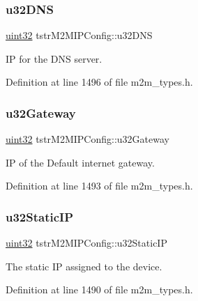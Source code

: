 \subsubsection{\texorpdfstring{u32\+D\+NS}{u32DNS}}
{\footnotesize\ttfamily \hyperlink{group__DataT_ga100e7c691a47d6978527c479a0158245}{uint32} tstr\+M2\+M\+I\+P\+Config\+::u32\+D\+NS}

IP for the D\+NS server. 

Definition at line 1496 of file m2m\+\_\+types.\+h.

\mbox{\label{structtstrM2MIPConfig_ad42bb813617dd8883f434f242ccebf8a}} 
\subsubsection{\texorpdfstring{u32\+Gateway}{u32Gateway}}
{\footnotesize\ttfamily \hyperlink{group__DataT_ga100e7c691a47d6978527c479a0158245}{uint32} tstr\+M2\+M\+I\+P\+Config\+::u32\+Gateway}

IP of the Default internet gateway. 

Definition at line 1493 of file m2m\+\_\+types.\+h.

\mbox{\label{structtstrM2MIPConfig_ad98262f0684c0e7a2ab01e8f3e2cce05}} 
\subsubsection{\texorpdfstring{u32\+Static\+IP}{u32StaticIP}}
{\footnotesize\ttfamily \hyperlink{group__DataT_ga100e7c691a47d6978527c479a0158245}{uint32} tstr\+M2\+M\+I\+P\+Config\+::u32\+Static\+IP}

The static IP assigned to the device. 

Definition at line 1490 of file m2m\+\_\+types.\+h.

\mbox{\label{structtstrM2MIPConfig_aeda2788391789636614f7d125b609f00}} 

